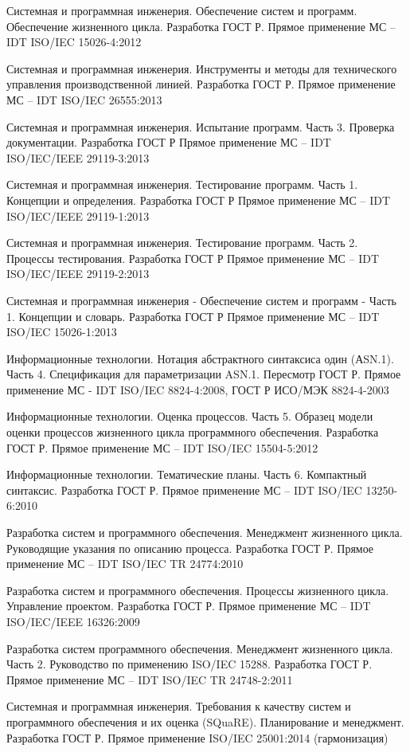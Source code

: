 Системная и программная инженерия. Обеспечение систем и программ. Обеспечение жизненного цикла. Разработка ГОСТ Р. Прямое применение МС – IDT ISO/IEC 15026-4:2012

Системная и программная инженерия. Инструменты и методы для технического управления производственной линией. Разработка ГОСТ Р. Прямое применение МС – IDT ISO/IEC 26555:2013

Системная и программная инженерия. Испытание программ. Часть 3. Проверка документации. Разработка ГОСТ Р Прямое применение МС – IDT ISO/IEC/IEEE 29119-3:2013

Системная и программная инженерия. Тестирование программ. Часть 1. Концепции и определения. Разработка ГОСТ Р Прямое применение МС – IDT ISO/IEC/IEEE 29119-1:2013

Системная и программная инженерия. Тестирование программ. Часть 2. Процессы тестирования. Разработка ГОСТ Р Прямое применение МС – IDT ISO/IEC/IEEE 29119-2:2013

Системная и программная инженерия - Обеспечение систем и программ - Часть 1. Концепции и словарь. Разработка ГОСТ Р Прямое применение МС – IDT ISO/IEC 15026-1:2013

Информационные технологии. Нотация абстрактного синтаксиса один (АSN.1). Часть 4. Спецификация для параметризации ASN.1. Пересмотр ГОСТ Р. Прямое применение МС - IDT ISO/IEC 8824-4:2008, ГОСТ Р ИСО/МЭК 8824-4-2003

Информационные технологии. Оценка процессов. Часть 5. Образец модели оценки процессов жизненного цикла программного обеспечения. Разработка ГОСТ Р. Прямое применение МС – IDT ISO/IEC 15504-5:2012

Информационные технологии. Тематические планы. Часть 6. Компактный синтаксис. Разработка ГОСТ Р. Прямое применение МС – IDT ISO/IEC 13250-6:2010

Разработка систем и программного обеспечения. Менеджмент жизненного цикла. Руководящие указания по описанию процесса. Разработка ГОСТ Р. Прямое применение МС – IDT ISO/IEC TR 24774:2010

Разработка систем и программного обеспечения. Процессы жизненного цикла. Управление проектом. Разработка ГОСТ Р. Прямое применение МС – IDT ISO/IEC/IEEE 16326:2009

Разработка систем программного обеспечения. Менеджмент жизненного цикла. Часть 2. Руководство по применению ISO/IEC 15288. Разработка ГОСТ Р. Прямое применение МС – IDT ISO/IEC TR 24748-2:2011

Системная и программная инженерия. Требования к качеству систем и программного обеспечения и их оценка (SQuaRE). Планирование и менеджмент. Разработка ГОСТ Р. Прямое применение ISO/IEC 25001:2014 (гармонизация)

